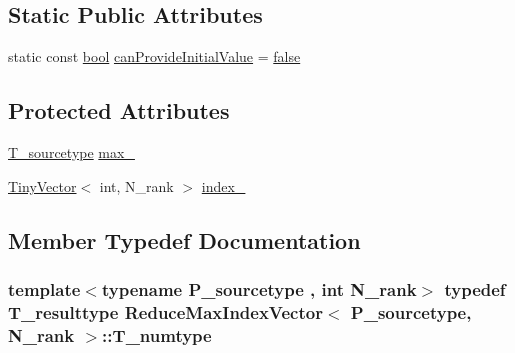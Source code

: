 \subsection*{Static Public Attributes}
\begin{DoxyCompactItemize}
\item 
static const \hyperlink{compiler_8h_abb452686968e48b67397da5f97445f5b}{bool} \hyperlink{classReduceMaxIndexVector_af8c999946124e0e9aa160b2b91ff5f7c}{can\+Provide\+Initial\+Value} = \hyperlink{compiler_8h_a65e9886d74aaee76545e83dd09011727}{false}
\end{DoxyCompactItemize}
\subsection*{Protected Attributes}
\begin{DoxyCompactItemize}
\item 
\hyperlink{classReduceMaxIndexVector_a959c30c0e834ac3a1f5c2a85e3f8521e}{T\+\_\+sourcetype} \hyperlink{classReduceMaxIndexVector_a4bc06bbd26b382063eb6bee1fa4bea4d}{max\+\_\+}
\item 
\hyperlink{classTinyVector}{Tiny\+Vector}$<$ int, N\+\_\+rank $>$ \hyperlink{classReduceMaxIndexVector_a725345ecc138ef851fc1ebc793763ace}{index\+\_\+}
\end{DoxyCompactItemize}


\subsection{Member Typedef Documentation}
\hypertarget{classReduceMaxIndexVector_aa1139b968fabe9c7696c31579e7faab0}{}
\subsubsection[{T\+\_\+numtype}]{\setlength{\rightskip}{0pt plus 5cm}template$<$typename P\+\_\+sourcetype , int N\+\_\+rank$>$ typedef {\bf T\+\_\+resulttype} {\bf Reduce\+Max\+Index\+Vector}$<$ P\+\_\+sourcetype, N\+\_\+rank $>$\+::{\bf T\+\_\+numtype}}\label{classReduceMaxIndexVector_aa1139b968fabe9c7696c31579e7faab0}
\hypertarget{classReduceMaxIndexVector_aa692334e6c8dff5065b896773e77eac8}{}
